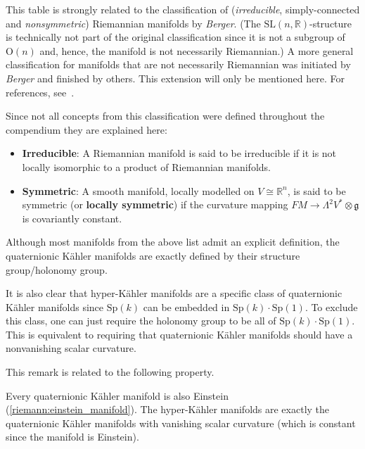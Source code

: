     \begin{remark*}
        This table is strongly related to the classification of (\textit{irreducible}, simply-connected and \textit{nonsymmetric}) Riemannian manifolds by \textit{Berger}. (The $\mathrm{SL}(n,\mathbb{R})$-structure is technically not part of the original classification since it is not a subgroup of $\mathrm{O}(n)$ and, hence, the manifold is not necessarily Riemannian.) A more general classification for manifolds that are not necessarily Riemannian was initiated by \textit{Berger} and finished by others. This extension will only be mentioned here. For references, see~\citet{rudolph_differential_2017}.

        Since not all concepts from this classification were defined throughout the compendium they are explained here:
        \begin{itemize}
            \item\textbf{Irreducible}: A Riemannian manifold is said to be irreducible if it is not locally isomorphic to a product of Riemannian manifolds.
            \item\textbf{Symmetric}: A smooth manifold, locally modelled on $V\cong\mathbb{R}^n$, is said to be symmetric (or \textbf{locally symmetric}) if the curvature mapping $FM\rightarrow\Lambda^2V^*\otimes\mathfrak{g}$ is covariantly constant.
        \end{itemize}
    \end{remark*}

    \begin{remark}
        Although most manifolds from the above list admit an explicit definition, the quaternionic K\"ahler manifolds are exactly defined by their structure group/holonomy group.

        It is also clear that hyper-K\"ahler manifolds are a specific class of quaternionic K\"ahler manifolds since $\mathrm{Sp}(k)$ can be embedded in $\mathrm{Sp}(k)\cdot\mathrm{Sp}(1)$. To exclude this class, one can just require the holonomy group to be all of $\mathrm{Sp}(k)\cdot\mathrm{Sp}(1)$. This is equivalent to requiring that quaternionic K\"ahler manifolds should have a nonvanishing scalar curvature.
    \end{remark}

    This remark is related to the following property.
    \begin{property}[Einstein]
        Every quaternionic K\"ahler manifold is also Einstein (\cref{riemann:einstein_manifold}). The hyper-K\"ahler manifolds are exactly the quaternionic K\"ahler manifolds with vanishing scalar curvature (which is constant since the manifold is Einstein).
    \end{property}